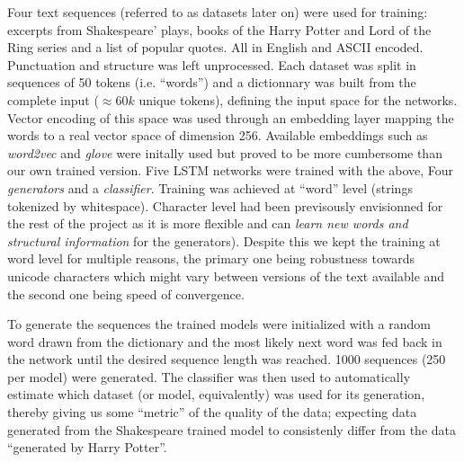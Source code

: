 
Four text sequences (referred to as datasets later on) were used for training:
excerpts from Shakespeare' plays, books of the Harry Potter and Lord of the
Ring series and a list of popular quotes.  All in English and ASCII encoded.
Punctuation and structure was left unprocessed.  Each dataset was split in
sequences of 50 tokens (i.e.  ``words'') and a dictionnary was built from the
complete input ($\approx 60k$ unique tokens), defining the input space for the
networks.  Vector encoding of this space was used through an embedding layer
mapping the words to a real vector space of dimension 256.  Available
embeddings such as \textit{word2vec} and \textit{glove} were initally used but
proved to be more cumbersome than our own trained version.  Five LSTM networks
were trained with the above, Four \textit{generators} and a
\textit{classifier}. Training was achieved at ``word'' level (strings tokenized
by whitespace). Character level had been previsously envisionned for the rest
of the project as it is more flexible and can \textit{learn new words and
structural information}\cite{gravesGenerating} for the generators). Despite
this we kept the training at word level for multiple reasons, the primary one
being robustness towards unicode characters which might vary between versions
of the text available and the second one being speed of convergence. 

To generate the sequences the trained models were initialized with a random word
drawn from the dictionary and the most likely next word was fed back in the network
until the desired sequence length was reached. 1000 sequences (250 per model) were
generated. The classifier was then used to automatically estimate which
dataset (or model, equivalently) was used for its generation, thereby giving us
some ``metric'' of the quality of the data; expecting data generated from the
Shakespeare trained model to consistenly differ from the data ``generated by
Harry Potter''.
\clearpage
